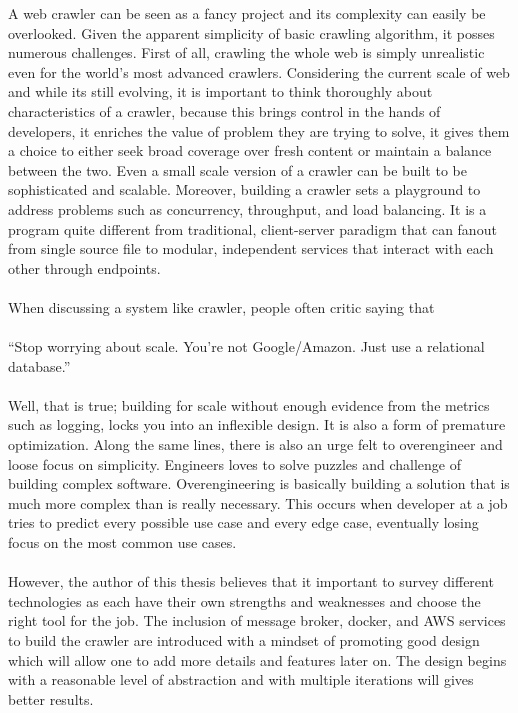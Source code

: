 \noindent
A web crawler can be seen as a fancy project and its complexity can easily be overlooked.
Given the apparent simplicity of basic crawling algorithm, it posses numerous challenges. First of all,
crawling the whole web is simply unrealistic even for the world's most advanced crawlers. Considering the
current scale of web and while its still evolving, it is important to think thoroughly about
characteristics of a crawler, because this brings control in the hands of developers, it enriches the
value of problem they are trying to solve, it gives them a choice to either seek broad coverage over fresh
content or maintain a balance between the two. Even a small scale version of a crawler can be built to
be sophisticated and scalable. Moreover, building a crawler sets a playground to address problems such
as concurrency, throughput, and load balancing. It is a program quite different from traditional,
client-server paradigm that can fanout from single source file to modular, independent services that interact with each other through endpoints. 
\\
\\
When discussing a system like crawler, people often critic saying that
\\
\\
``Stop worrying about scale. You're not Google/Amazon. Just use a relational database.''
\\
\\
Well, that is true; building for scale without enough evidence from the metrics such as logging, locks you into an inflexible design. It is also a form
of premature optimization. Along the same lines, there is also an urge felt to overengineer and loose
focus on simplicity. Engineers loves to solve puzzles and challenge of building complex software. Overengineering is basically building a solution that is much more complex than is really necessary. This occurs when developer at a job tries to predict every possible use case and every edge case, eventually losing focus on the most common use cases.  
\\
\\
However, the author of this thesis believes that it important to survey different technologies as each have
their own strengths and weaknesses and choose the right tool for the job. The inclusion of message broker, docker, and AWS services to build the crawler are introduced with a mindset of promoting good design which will allow one to add more details and features later on. The design begins with a reasonable level of abstraction and with multiple iterations will gives better results.


